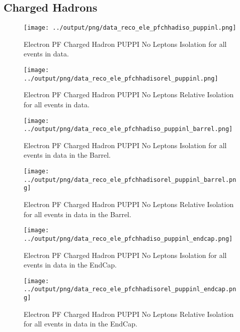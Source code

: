 \documentclass[11pt]{book}
\begin{document}
\subsection{Charged Hadrons}
\begin{figure}[htb]
\centering
\texttt{[image: ../output/png/data\_reco\_ele\_pfchhadiso\_puppinl.png]}
\caption{Electron PF Charged Hadron PUPPI No Leptons Isolation for all events in data.}
\label{fig:data_ele_pfchhadiso_puppinl}
\end{figure}

\begin{figure}[htb]
\centering
\texttt{[image: ../output/png/data\_reco\_ele\_pfchhadisorel\_puppinl.png]}
\caption{Electron PF Charged Hadron PUPPI No Leptons Relative Isolation for all events in data.}
\label{fig:data_ele_pfchhadisorel_puppinl}
\end{figure}

\begin{figure}[htb]
\centering
\texttt{[image: ../output/png/data\_reco\_ele\_pfchhadiso\_puppinl\_barrel.png]}
\caption{Electron PF Charged Hadron PUPPI No Leptons Isolation for all events in data in the Barrel.}
\label{fig:data_ele_pfchhadiso_puppinl_barrel}
\end{figure}

\begin{figure}[htb]
\centering
\texttt{[image: ../output/png/data\_reco\_ele\_pfchhadisorel\_puppinl\_barrel.png]}
\caption{Electron PF Charged Hadron PUPPI No Leptons Relative Isolation for all events in data in the Barrel.}
\label{fig:data_ele_pfchhadisorel_puppinl_barrel}
\end{figure}

\begin{figure}[htb]
\centering
\texttt{[image: ../output/png/data\_reco\_ele\_pfchhadiso\_puppinl\_endcap.png]}
\caption{Electron PF Charged Hadron PUPPI No Leptons Isolation for all events in data in the EndCap.}
\label{fig:data_ele_pfchhadiso_puppinl_endcap}
\end{figure}

\begin{figure}[htb]
\centering
\texttt{[image: ../output/png/data\_reco\_ele\_pfchhadisorel\_puppinl\_endcap.png]}
\caption{Electron PF Charged Hadron PUPPI No Leptons Relative Isolation for all events in data in the EndCap.}
\label{fig:data_ele_pfchhadisorel_puppinl_endcap}
\end{figure}
\clearpage
\end{document}
